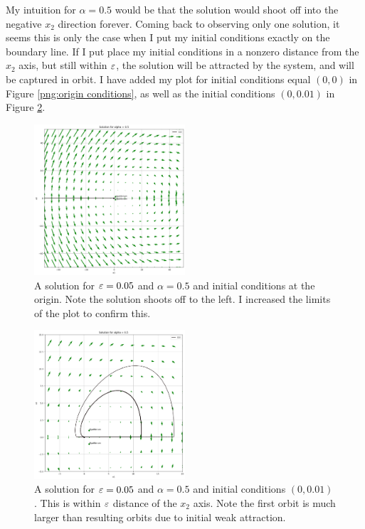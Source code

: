 \begin{solution}
    \vspace{\floatsep}
    \clearpage


    My intuition for $\alpha = 0.5$ would be that the solution would shoot off into the negative $x_2$ direction forever. Coming back to observing only one solution, it seems this is only the case when I put my initial conditions exactly on the boundary line. If I put place my initial conditions in a nonzero distance from the $x_2$ axis, but still within $\varepsilon$, the solution will be attracted by the system, and will be captured in orbit. I have added my plot for initial conditions equal $(0, 0)$ in Figure \ref{png:origin  conditions}, as well as the initial conditions $(0, 0.01)$ in Figure \ref{png:perturbation condition}.
    
    \jump
    \begin{figure}[!ht]
    \centering
    \includegraphics[width = 0.5\textwidth]{Images/origin conditions.png}
    \caption{A solution for $\varepsilon = 0.05$ and $\alpha = 0.5$ and initial conditions at the origin. Note the solution shoots off to the left. I increased the limits of the plot to confirm this.}
    \label{png:origin conditions}
    \end{figure}

    \vspace{\floatsep}
    \clearpage

    \jump
    \begin{figure}[!ht]
    \centering
    \includegraphics[width = 0.5\textwidth]{Images/perturbation conditions.png}
    \caption{A solution for $\varepsilon = 0.05$ and $\alpha = 0.5$ and initial conditions $(0, 0.01)$. This is within $\varepsilon$ distance of the $x_2$ axis. Note the first orbit is much larger than resulting orbits due to initial weak attraction.}
    \label{png:perturbation condition}
    \end{figure}


\end{solution}
